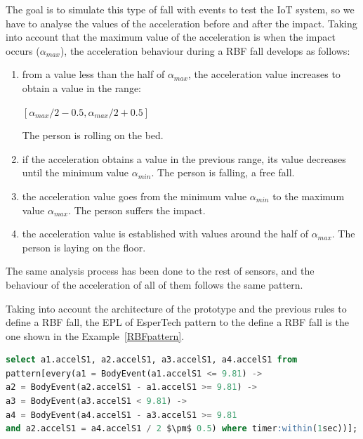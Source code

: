 \documentclass[review]{elsarticle}
\begin{document}
The goal is to simulate this type of fall with events to test the IoT system, so we have to analyse the values of 
the acceleration before and after the impact. Taking into account that the maximum value of the acceleration is 
when the impact occurs ($\alpha_{max}$), the acceleration behaviour
during a RBF fall develops as follows:
\begin{enumerate}
 \item from a value less than the half of $\alpha_{max}$, the acceleration value increases to obtain a value in the range:
  \begin{center}
  $[\alpha_{max}/2 - 0.5, \alpha_{max}/2 + 0.5]$
  \end{center}
 The person is rolling on the bed.
 \item if the acceleration obtains a value in the previous range, its value decreases until the minimum value $\alpha_{min}$.
 The person is falling, a free fall.
 \item the acceleration value goes from the minimum value $\alpha_{min}$ to the maximum value $\alpha_{max}$. The person
 suffers the impact.
 \item the acceleration value is established with values around the half of $\alpha_{max}$. The person is laying on the floor. 
\end{enumerate}

The same analysis process has been done to the rest of sensors, and the behaviour of the acceleration of all of them 
follows the same pattern.

Taking into account the architecture of the prototype and the previous rules to define a RBF fall, the EPL of EsperTech
pattern to the define a RBF fall is the one shown in the Example~\ref{RBFpattern}.

\begin{lstlisting}[basicstyle=\ttfamily\footnotesize,language=SQL, mathescape,caption=RBF pattern,label=RBFpattern]
select a1.accelS1, a2.accelS1, a3.accelS1, a4.accelS1 from 
pattern[every(a1 = BodyEvent(a1.accelS1 <= 9.81) -> 
a2 = BodyEvent(a2.accelS1 - a1.accelS1 >= 9.81) ->
a3 = BodyEvent(a3.accelS1 < 9.81) ->
a4 = BodyEvent(a4.accelS1 - a3.accelS1 >= 9.81 
and a2.accelS1 = a4.accelS1 / 2 $\pm$ 0.5) where timer:within(1sec))];
\end{lstlisting}
\end{document}
